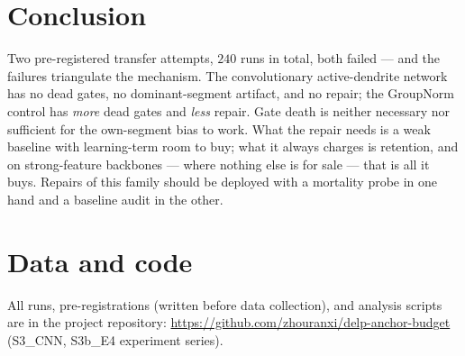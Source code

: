 \documentclass[review]{elsarticle}
\begin{document}
\section{Conclusion}

Two pre-registered transfer attempts, $240$ runs in total, both
failed --- and the failures triangulate the mechanism. The
convolutionary active-dendrite network has no dead gates, no
dominant-segment artifact, and no repair; the GroupNorm control has
\emph{more} dead gates and \emph{less} repair. Gate death is neither
necessary nor sufficient for the own-segment bias to work. What the
repair needs is a weak baseline with learning-term room to buy; what
it always charges is retention, and on strong-feature backbones ---
where nothing else is for sale --- that is all it buys. Repairs of
this family should be deployed with a mortality probe in one hand and
a baseline audit in the other.

\section*{Data and code}

All runs, pre-registrations (written before data collection), and
analysis scripts are in the project repository:
\url{https://github.com/zhouranxi/delp-anchor-budget}
(S3\_CNN, S3b\_E4 experiment series).



\end{document}
